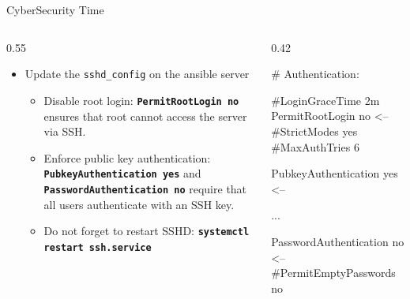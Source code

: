 \documentclass[aspectratio=169,12pt]{beamer}
\begin{document}
\begin{frame}[fragile]{CyberSecurity Time}
\begin{columns}[T]
\begin{column}{0.55\textwidth}
\begin{itemize}
  \item Update the \texttt{sshd\_config} on the ansible server
  \begin{itemize}
    \item Disable root login: \textbf{\texttt{PermitRootLogin no}} ensures that root cannot access the server via SSH.
    \item Enforce public key authentication: \textbf{\texttt{PubkeyAuthentication yes}} and \textbf{\texttt{PasswordAuthentication no}} require that all users authenticate with an SSH key.
    \item Do not forget to restart SSHD: \textbf{\texttt{systemctl restart ssh.service}}
  \end{itemize}
\end{itemize}
\end{column}
\begin{column}{0.42\textwidth}
\begin{termsmall}
# Authentication:

#LoginGraceTime 2m
PermitRootLogin no          <--
#StrictModes yes
#MaxAuthTries 6

PubkeyAuthentication yes    <--

...

PasswordAuthentication no   <--
#PermitEmptyPasswords no
\end{termsmall}
\end{column}
\end{columns}
\end{frame}
\end{document}
